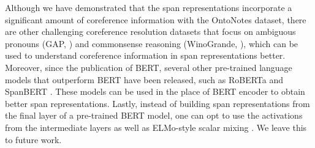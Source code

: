 \documentclass[11pt]{article}
\begin{document}
Although we have demonstrated that the span representations incorporate a significant amount of coreference information with the OntoNotes dataset, there are other challenging coreference resolution datasets that focus on ambiguous pronouns (GAP, \parencite{webster2018gap}) and commonsense reasoning (WinoGrande, \parencite{winogrande}), which can be used to understand coreference information in span representations better.
Moreover, since the publication of BERT, several other pre-trained language models that outperform BERT have been released, such as RoBERTa \parencite{roberta} and SpanBERT \parencite{spanbert}. These models can be used in the place of BERT encoder to obtain better span representations. Lastly, instead of building span representations from the final layer of a pre-trained BERT model, one can opt to use the activations from the intermediate layers as well as ELMo-style scalar mixing \parencite{tenney2019context,peters2018elmo}. We leave this to future work.


\printbibliography
\end{document}
